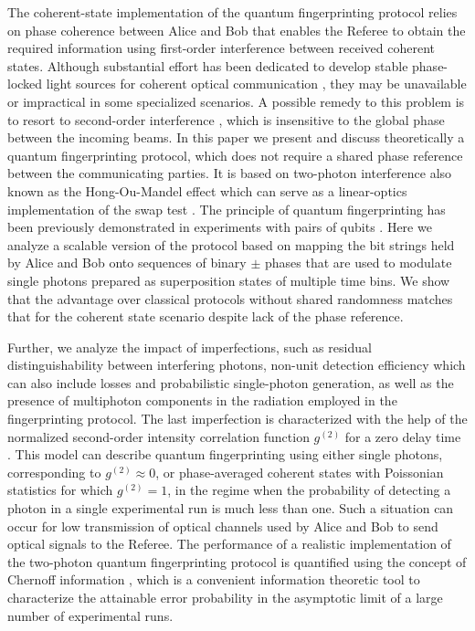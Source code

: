 \documentclass[10pt]{article}
\begin{document}
The coherent-state implementation of the quantum fingerprinting
protocol relies on phase coherence between Alice and Bob that
enables the Referee to obtain the required information using
first-order interference between received coherent states. Although
substantial effort has been dedicated to develop stable phase-locked light sources
for coherent optical communication \cite{Kitayama}, they may be unavailable or
impractical in some specialized scenarios. A possible remedy to this problem is to resort to
second-order interference \cite{Mandel}, which is insensitive to the global phase
between the incoming beams. In this paper we present and discuss theoretically a quantum fingerprinting protocol, which does not require a shared phase reference between the communicating parties. It is based on two-photon interference also known as the Hong-Ou-Mandel effect \cite{HOMI} which can serve as a linear-optics implementation of the swap test \cite{Garcia}.
The principle of quantum fingerprinting has been previously demonstrated in experiments with pairs of qubits \cite{Horn,Du}.
Here we analyze a scalable version of the protocol based on mapping the bit strings held by Alice and Bob onto sequences of binary $\pm$ phases that are used to modulate single photons prepared as superposition states of multiple time bins. We show that the advantage over classical protocols without shared randomness matches that for the coherent state scenario despite lack of the phase reference.

Further, we analyze the impact of imperfections, such as residual distinguishability between interfering photons, non-unit detection efficiency which can also include losses and probabilistic single-photon generation, as well as the presence of multiphoton components in the radiation employed in the fingerprinting protocol. The last imperfection is characterized with the help of the normalized second-order intensity correlation function $g^{(2)}$ for a zero delay time \cite{Mandel}. This model can describe quantum fingerprinting using either single photons, corresponding to $g^{(2)} \approx 0$, or phase-averaged coherent states with Poissonian statistics for which $g^{(2)} = 1$, in the regime when the probability of detecting a photon in a single experimental run is much less than one. Such a situation can occur for low transmission of optical channels used by Alice and Bob to send optical signals to the Referee. The performance of a realistic implementation of the two-photon quantum fingerprinting protocol is quantified using the concept of Chernoff information \cite{CoverThomas}, which is a convenient information theoretic tool to characterize the attainable error probability in the asymptotic limit of a large number of experimental runs.
\end{document}
